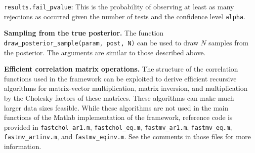 \documentclass{book}
\begin{document}
{\tt results.fail\_pvalue}: This is the probability of observing at least as many rejections as occurred given the number
of tests and the confidence level {\tt alpha}. 

%
%

\vspace{.1in}
\textbf{Sampling from the true posterior.} The function {\tt draw\_posterior\_sample(param, post, N)} can be used
to draw $N$ samples from the posterior. The arguments are similar to those described above. 

\vspace{.1in}
\textbf{Efficient correlation matrix operations.} The structure of the correlation functions used in the framework
can be exploited to derive efficient recursive algorithms for matrix-vector multiplication, matrix inversion, and
multiplication by the Cholesky factors of these matrices. These algorithms can make much larger data sizes
feasible. While these algorithms are not used in the main functions of the Matlab implementation of the framework,
reference code is provided in {\tt fastchol\_ar1.m}, {\tt fastchol\_eq.m}, {\tt fastmv\_ar1.m}, {\tt fastmv\_eq.m}, 
{\tt fastmv\_ar1inv.m}, and {\tt fastmv\_eqinv.m}. See the comments in those files for more information. 
\end{document}
